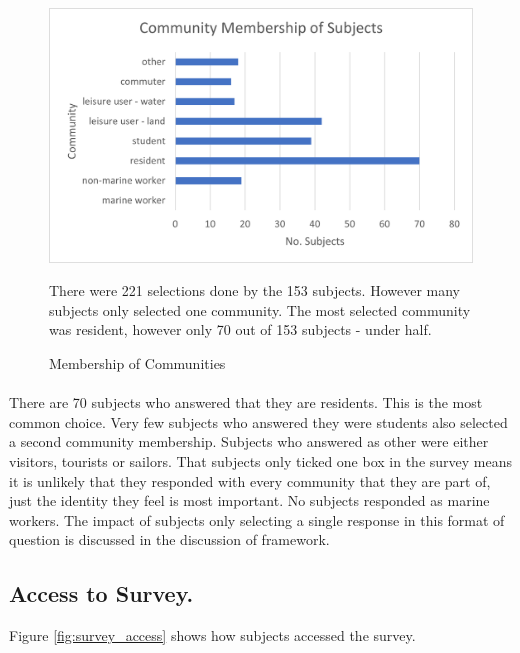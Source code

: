 \begin{figure}[H]
    \centering
    \includegraphics{fig_results/com-mem-horizontal.png}
    \caption{Membership of Communities}{ There were 221 selections done by the 153 subjects. However many subjects only selected one community. The most selected community was resident, however only 70 out of 153 subjects - under half. }
    \label{fig:community_membership}
\end{figure}
\paragraph{}

There are 70 subjects who answered that they are residents. This is the most common choice. Very few subjects who answered they were students also selected a second community membership. Subjects who answered as other were either visitors, tourists or sailors. That subjects only ticked one box in the survey means it is unlikely that they responded with every community that they are part of, just the identity they feel is most important. No subjects responded as marine workers. The impact of subjects only selecting a single response in this format of question is discussed in the discussion of framework. 


\subsection{Access to Survey. }
Figure \ref{fig:survey_access} shows how subjects accessed the survey.  

